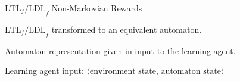 \begin{frame}{$\text{LTL}_f\text{/LDL}_f$ Non-Markovian Rewards}
	\begin{block}{}
		$\text{LTL}_f\text{/LDL}_f$ transformed to an equivalent automaton.
	\end{block}
	\begin{block}{}
		Automaton representation given in input to the learning agent.
	\end{block}
	\begin{block}{}
		Learning agent input:
		$\langle\text{environment state, automaton state}\rangle$
	\end{block}
\end{frame}